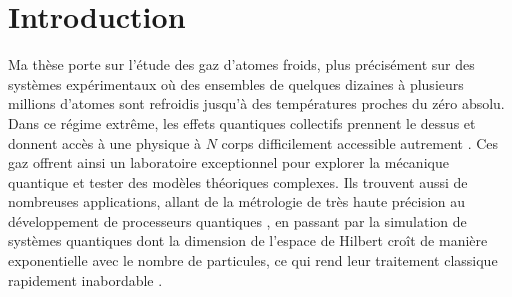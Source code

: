 
\chapter{Introduction}



Ma thèse porte sur l’étude des gaz d’atomes froids, plus précisément sur  des systèmes expérimentaux où des ensembles de quelques dizaines à plusieurs millions d’atomes sont refroidis jusqu’à des températures proches du zéro absolu. Dans ce régime extrême, les effets quantiques collectifs prennent le dessus et donnent accès à une physique à $N$ corps difficilement accessible autrement \cite{RevModPhys.80.885}. Ces gaz offrent ainsi un laboratoire exceptionnel pour explorer la mécanique quantique et tester des modèles théoriques complexes. Ils trouvent aussi de nombreuses applications, allant de la métrologie de très haute précision au développement de processeurs quantiques \cite{PhysRevLett.96.010401}, en passant par la simulation de systèmes quantiques dont la dimension de l’espace de Hilbert croît de manière exponentielle avec le nombre de particules, ce qui rend leur traitement classique rapidement inabordable \cite{Nielsen2010,Feynman1982}.%

\medskip 

